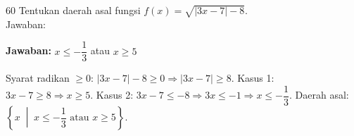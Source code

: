 \documentclass[11pt]{article}
\newcommand{\jawaban}[1]{%
  \noindent\colorbox{gold!30}{\parbox{\dimexpr\linewidth-2\fboxsep\relax}{%
    \textbf{Jawaban:} #1}}\par\smallskip}
\begin{document}
\begin{soal}{60}
Tentukan daerah asal fungsi $f(x)=\sqrt{|3x-7|-8}$.\\[0.4em]
Jawaban:\enspace\underline{\hspace{7cm}}
\end{soal}
\begin{pembox}
\jawaban{$x\leq-\dfrac{1}{3}$ atau $x\geq5$}
Syarat radikan $\geq0$: $|3x-7|-8\geq0\Rightarrow|3x-7|\geq8$.
Kasus 1: $3x-7\geq8\Rightarrow x\geq5$.
Kasus 2: $3x-7\leq-8\Rightarrow3x\leq-1\Rightarrow x\leq-\dfrac{1}{3}$.
Daerah asal: $\left\{x\;\middle|\;x\leq-\dfrac{1}{3}\text{ atau }x\geq5\right\}$.
\end{pembox}
\end{document}
